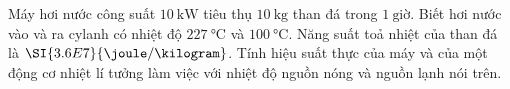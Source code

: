 \begin{vd}
Máy hơi nước công suất $\SI{10}{\kilo\watt}$ tiêu thụ $\SI{10}{\kilogram}$ than đá trong $\SI{1}{\text{giờ}}$. Biết hơi nước vào và ra cylanh có nhiệt độ $\SI{227}{\celsius}$ và $\SI{100}{\celsius}$. Năng suất toả nhiệt của than đá là $\SI{3.6E7}{\joule/\kilogram}$. Tính hiệu suất thực của máy và của một động cơ nhiệt lí tưởng làm việc với nhiệt độ nguồn nóng và nguồn lạnh nói trên.

\end{vd}
